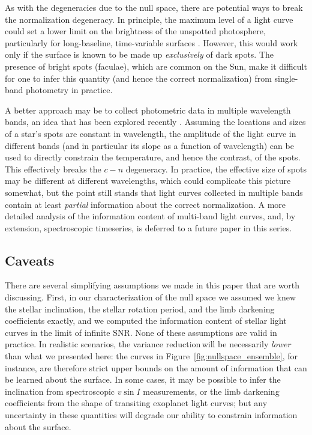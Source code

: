 \documentclass[modern]{aastex62}
\newcommand{\shrinkage}{{variance reduction\,}}
\begin{document}

As with the degeneracies due to the null space, there are potential ways
to break the normalization degeneracy.
%
In principle, the maximum level of a light curve could set a lower limit on
the brightness of the
unspotted photosphere, particularly for long-baseline, time-variable
surfaces \citep{Basri2018}. However, this would work only if the surface is
known to be made up \emph{exclusively} of dark spots. The presence of bright
spots (faculae), which are common on the Sun, make it difficult
for one to infer this quantity (and hence the correct normalization)
from single-band photometry in practice.

A better approach may be to collect photometric data in
multiple wavelength bands, an idea that has
been explored recently \citep[e.g.,][]{Gully2017,Guo2018}. Assuming the
locations and sizes of a star's spots are constant in wavelength, the amplitude
of the light curve in different bands (and in particular its slope as a function
of wavelength) can be used to directly constrain the
temperature, and hence the contrast, of the spots. This effectively breaks the
$c-n$ degeneracy. In practice, the effective size of spots may be different
at different wavelengths, which could complicate this picture somewhat, but
the point still stands that light curves collected in multiple bands
contain at least \emph{partial} information about the correct normalization.
%
A more detailed analysis of the information content of multi-band light curves,
and, by extension, spectroscopic timeseries, is deferred to a future paper
in this series.

\subsection{Caveats}
\label{sec:caveats}

There are several simplifying assumptions we made in this paper that
are worth discussing. First, in our characterization of the null space
we assumed we knew the stellar inclination, the stellar rotation period,
and the limb darkening coefficients
exactly, and we computed the information content of stellar light curves
in the limit of infinite SNR. None of these assumptions are valid in
practice. In realistic scenarios, the \shrinkage will be
necessarily \emph{lower} than what we presented here: the curves in
Figure~\ref{fig:nullspace_ensemble}, for instance, are therefore
strict upper bounds on the amount of information that can be learned about
the surface. In some cases, it may be possible to infer the inclination
from spectroscopic $v \sin I$ measurements, or the limb darkening coefficients
from the shape of transiting exoplanet light curves; but any uncertainty
in these quantities will degrade our ability to constrain
information about the surface.
\end{document}
